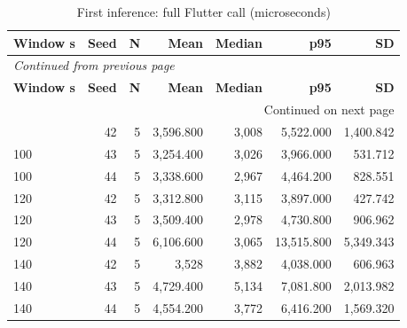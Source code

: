 \documentclass[10pt,a4paper]{article}
\begin{document}
\begin{longtable}{@{}lrrrrrr@{}}
\caption{First inference:\allowbreak{} full Flutter call (microseconds)}\\
\toprule
\textbf{Window s} & \textbf{Seed} & \textbf{N} & \textbf{Mean} & \textbf{Median} & \textbf{p95} & \textbf{SD} \\
\midrule\endfirsthead
\multicolumn{7}{l}{\small\itshape Continued from previous page}\\
\toprule
\textbf{Window s} & \textbf{Seed} & \textbf{N} & \textbf{Mean} & \textbf{Median} & \textbf{p95} & \textbf{SD} \\
\midrule\endhead
\midrule\multicolumn{7}{r}{\small Continued on next page}\\\endfoot
\bottomrule\endlastfoot
100 & 42 & 5 & 3,596.800 & 3,008 & 5,522.000 & 1,400.842 \\
100 & 43 & 5 & 3,254.400 & 3,026 & 3,966.000 & 531.712 \\
100 & 44 & 5 & 3,338.600 & 2,967 & 4,464.200 & 828.551 \\
120 & 42 & 5 & 3,312.800 & 3,115 & 3,897.000 & 427.742 \\
120 & 43 & 5 & 3,509.400 & 2,978 & 4,730.800 & 906.962 \\
120 & 44 & 5 & 6,106.600 & 3,065 & 13,515.800 & 5,349.343 \\
140 & 42 & 5 & 3,528 & 3,882 & 4,038.000 & 606.963 \\
140 & 43 & 5 & 4,729.400 & 5,134 & 7,081.800 & 2,013.982 \\
140 & 44 & 5 & 4,554.200 & 3,772 & 6,416.200 & 1,569.320 \\
\end{longtable}\endgroup
\begingroup\small\setlength{\tabcolsep}{4pt}\renewcommand{\arraystretch}{1.12}
\end{document}
